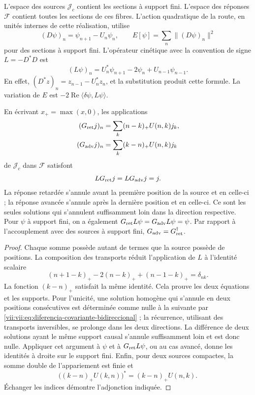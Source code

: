 L'espace des sources \(\mathcal J_c\) contient les sections à support
fini. L'espace des réponses \(\mathcal F\) contient toutes les
sections de ces fibres. L'action quadratique de la route, en unités
internes de cette réalisation, utilise
\[
 (D\psi)_n=\psi_{n+1}-U_n\psi_n,\qquad
 E[\psi]=\sum_n\|(D\psi)_n\|^2
\]
pour des sections à support fini. L'opérateur cinétique avec la convention
de signe \(L=-D^*D\) est
\begin{equation}
 (L\psi)_n=U_n^*\psi_{n+1}-2\psi_n+U_{n-1}\psi_{n-1}.
 \label{vii:vii:eq:diferencia-covariante-bidireccional}
\end{equation}
En effet, \((D^*z)_n=z_{n-1}-U_n^*z_n\), et la substitution produit cette formule. La variation de \(E\) est \(-2\operatorname{Re}\langle\delta\psi,L\psi\rangle\).

\begin{theorem}
\label{vii:vii:thm:green-cronologico}
En écrivant \(x_+=\max(x,0)\), les applications
\begin{align}
 (G_{\rm ret}j)_n&=\sum_k(n-k)_+U(n,k)j_k,\label{vii:vii:eq:green-ret-cronologico}\\
 (G_{\rm adv}j)_n&=\sum_k(k-n)_+U(n,k)j_k\label{vii:vii:eq:green-adv-cronologico}
\end{align}
de \(\mathcal J_c\) dans \(\mathcal F\) satisfont
\[
 LG_{\rm ret}j=LG_{\rm adv}j=j.
\]
La réponse retardée s'annule avant la première position de la source et en celle-ci ; la réponse avancée s'annule après la dernière position et en celle-ci. Ce sont les seules solutions qui s'annulent suffisamment loin dans la direction respective. Pour \(\psi\) à support fini, on a également \(G_{\rm ret}L\psi=G_{\rm adv}L\psi=\psi\). Par rapport à l'accouplement avec des sources à support fini, \(G_{\rm adv}=G_{\rm ret}^{\dagger}\).
\end{theorem}
\begin{proof}
Chaque somme possède autant de termes que la source possède de positions.
La composition des transports réduit l'application de \(L\) à
l'identité scalaire
\[
 (n+1-k)_+-2(n-k)_++(n-1-k)_+=\delta_{nk}.
\]
La fonction \((k-n)_+\) satisfait la même identité. Cela prouve
les deux équations et les supports. Pour l'unicité, une solution
homogène qui s'annule en deux positions consécutives est déterminée
comme nulle à la suivante par \eqref{vii:vii:eq:diferencia-covariante-bidireccional} ;
la récurrence, utilisant des transports inversibles, se prolonge dans les deux
directions. La différence de deux solutions ayant le même support causal
s'annule suffisamment loin et est donc nulle.
Appliquer cet argument à \(\psi\) et à \(G_{\rm ret}L\psi\), ou au
cas avancé, donne les identités à droite sur le support fini.
Enfin, pour deux sources compactes, la somme double de l'appariement
est finie et
\[
 \bigl((k-n)_+U(k,n)\bigr)^*=(k-n)_+U(n,k).
\]
Échanger les indices démontre l'adjonction indiquée.
\end{proof}

